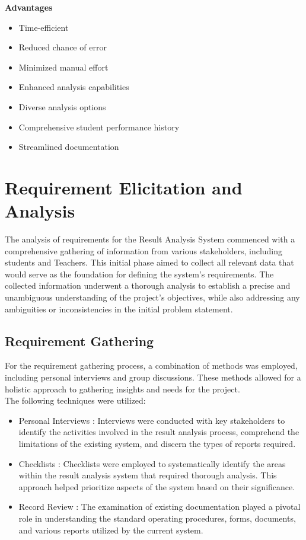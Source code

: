 \documentclass{nascproject}
\begin{document}
\textbf{Advantages}
\begin{itemize}
	\item Time-efficient
	\item Reduced chance of error
	\item Minimized manual effort
	\item Enhanced analysis capabilities
	\item Diverse analysis options
	\item Comprehensive student performance history
	\item Streamlined documentation
\end{itemize}
\section{Requirement Elicitation and Analysis}
The analysis of requirements for the Result Analysis System commenced with a comprehensive gathering of information from various stakeholders, including students and Teachers. This initial phase aimed to collect all relevant data that would serve as the foundation for defining the system's requirements. The collected information underwent a thorough analysis to establish a precise and unambiguous understanding of the project's objectives, while also addressing any ambiguities or inconsistencies in the initial problem statement.
\subsection{Requirement Gathering}
For the requirement gathering process, a combination of methods was employed, including personal interviews and group discussions. These methods allowed for a holistic approach to gathering insights and needs for the project.\\
The following techniques were utilized:
\begin{itemize}
	\item Personal Interviews : Interviews were conducted with key stakeholders to identify the activities involved in the result analysis process, comprehend the limitations of the existing system, and discern the types of reports required.
	\item Checklists : Checklists were employed to systematically identify the areas within the result analysis system that required thorough analysis. This approach helped prioritize aspects of the system based on their significance. 
	\item Record Review : The examination of existing documentation played a pivotal role in understanding the standard operating procedures, forms, documents, and various reports utilized by the current system.
\end{itemize}
\end{document}
